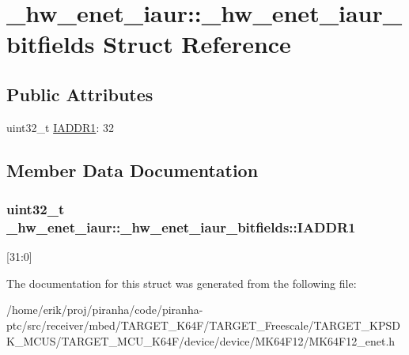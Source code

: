 \hypertarget{struct__hw__enet__iaur_1_1__hw__enet__iaur__bitfields}{}\section{\+\_\+hw\+\_\+enet\+\_\+iaur\+:\+:\+\_\+hw\+\_\+enet\+\_\+iaur\+\_\+bitfields Struct Reference}
\label{struct__hw__enet__iaur_1_1__hw__enet__iaur__bitfields}
\subsection*{Public Attributes}
\begin{DoxyCompactItemize}
\item 
uint32\+\_\+t \hyperlink{struct__hw__enet__iaur_1_1__hw__enet__iaur__bitfields_a51774e0cd6f9edc3a9c76c4e46ecec21}{I\+A\+D\+D\+R1}\+: 32
\end{DoxyCompactItemize}


\subsection{Member Data Documentation}
\subsubsection[{\texorpdfstring{I\+A\+D\+D\+R1}{IADDR1}}]{\setlength{\rightskip}{0pt plus 5cm}uint32\+\_\+t \+\_\+hw\+\_\+enet\+\_\+iaur\+::\+\_\+hw\+\_\+enet\+\_\+iaur\+\_\+bitfields\+::\+I\+A\+D\+D\+R1}\hypertarget{struct__hw__enet__iaur_1_1__hw__enet__iaur__bitfields_a51774e0cd6f9edc3a9c76c4e46ecec21}{}\label{struct__hw__enet__iaur_1_1__hw__enet__iaur__bitfields_a51774e0cd6f9edc3a9c76c4e46ecec21}
\mbox{[}31\+:0\mbox{]} 

The documentation for this struct was generated from the following file\+:\begin{DoxyCompactItemize}
\item 
/home/erik/proj/piranha/code/piranha-\/ptc/src/receiver/mbed/\+T\+A\+R\+G\+E\+T\+\_\+\+K64\+F/\+T\+A\+R\+G\+E\+T\+\_\+\+Freescale/\+T\+A\+R\+G\+E\+T\+\_\+\+K\+P\+S\+D\+K\+\_\+\+M\+C\+U\+S/\+T\+A\+R\+G\+E\+T\+\_\+\+M\+C\+U\+\_\+\+K64\+F/device/device/\+M\+K64\+F12/M\+K64\+F12\+\_\+enet.\+h\end{DoxyCompactItemize}
